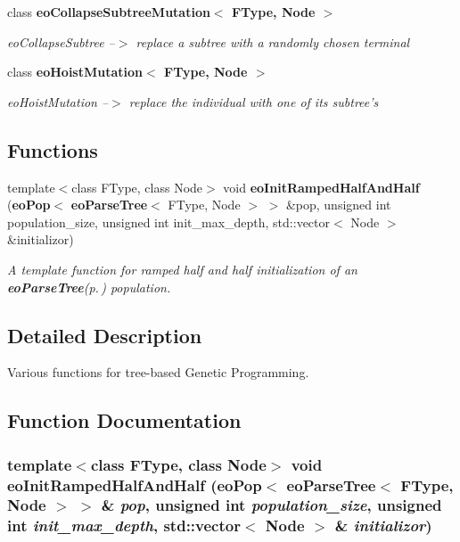 \begin{CompactItemize}
class {\bf eo\-Collapse\-Subtree\-Mutation$<$ FType, Node $>$}
\begin{CompactList}\small\item\em eo\-Collapse\-Subtree --$>$ replace a subtree with a randomly chosen terminal \item\end{CompactList}\item 
class {\bf eo\-Hoist\-Mutation$<$ FType, Node $>$}
\begin{CompactList}\small\item\em eo\-Hoist\-Mutation --$>$ replace the individual with one of its subtree's \item\end{CompactList}\end{CompactItemize}
\subsection*{Functions}
\begin{CompactItemize}
\item 
template$<$class FType, class Node$>$ void {\bf eo\-Init\-Ramped\-Half\-And\-Half} ({\bf eo\-Pop}$<$ {\bf eo\-Parse\-Tree}$<$ FType, Node $>$ $>$ \&pop, unsigned int population\_\-size, unsigned int init\_\-max\_\-depth, std::vector$<$ Node $>$ \&initializor)
\begin{CompactList}\small\item\em A template function for ramped half and half initialization of an {\bf eo\-Parse\-Tree}{\rm (p.\,\pageref{classeo_parse_tree})} population. \item\end{CompactList}\end{CompactItemize}


\subsection{Detailed Description}
Various functions for tree-based Genetic Programming. 



\subsection{Function Documentation}
\subsubsection{\setlength{\rightskip}{0pt plus 5cm}template$<$class FType, class Node$>$ void eo\-Init\-Ramped\-Half\-And\-Half ({\bf eo\-Pop}$<$ {\bf eo\-Parse\-Tree}$<$ FType, Node $>$ $>$ \& {\em pop}, unsigned int {\em population\_\-size}, unsigned int {\em init\_\-max\_\-depth}, std::vector$<$ Node $>$ \& {\em initializor})}\label{group___parse_tree_ga0}


